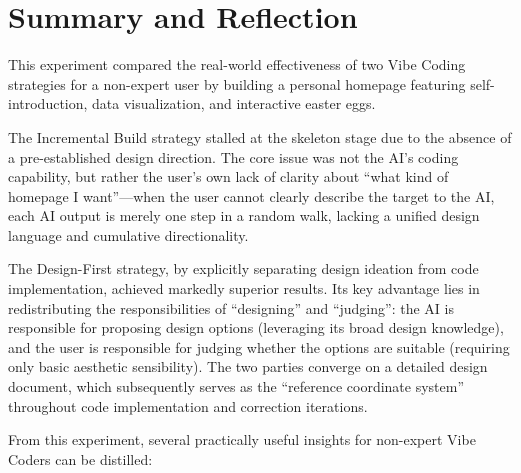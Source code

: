 \section{Summary and Reflection}

This experiment compared the real-world effectiveness of two Vibe Coding strategies for a non-expert user by building a personal homepage featuring self-introduction, data visualization, and interactive easter eggs.

The Incremental Build strategy stalled at the skeleton stage due to the absence of a pre-established design direction. The core issue was not the AI's coding capability, but rather the user's own lack of clarity about ``what kind of homepage I want''---when the user cannot clearly describe the target to the AI, each AI output is merely one step in a random walk, lacking a unified design language and cumulative directionality.

The Design-First strategy, by explicitly separating design ideation from code implementation, achieved markedly superior results. Its key advantage lies in redistributing the responsibilities of ``designing'' and ``judging'': the AI is responsible for proposing design options (leveraging its broad design knowledge), and the user is responsible for judging whether the options are suitable (requiring only basic aesthetic sensibility). The two parties converge on a detailed design document, which subsequently serves as the ``reference coordinate system'' throughout code implementation and correction iterations.

From this experiment, several practically useful insights for non-expert Vibe Coders can be distilled:

